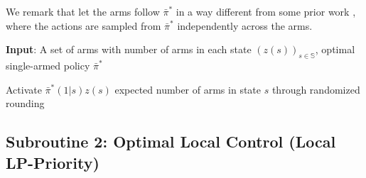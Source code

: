 \documentclass[11pt,letterpaper]{article}
\theoremstyle{plain}
\theoremstyle{definition}
\theoremstyle{remark}
\newcommand{\sspa}{\mathbb{S}}
\newcommand{\pibar}{{\sysbar{\pi}}}
\newcommand{\pibs}{{\pibar^*}}
\newcommand{\sysbar}[1]{\bar{#1}}
\begin{document}
We remark that  let the arms follow $\pibs$ in a way different from some prior work \citep{HonXieCheWan_23,HonXieCheWan_24}, where the actions are sampled from $\pibs$ independently across the arms. 



\begin{subroutine}[t]
\caption{Unconstrained Optimal Control}
\label{alg:follow-pibs}
\hspace*{\algorithmicindent} \hspace{-0.8em} \textbf{Input}: A set of arms with number of arms in each state $(z(s))_{s\in\sspa}$, 
optimal single-armed policy $\pibs$
\begin{algorithmic}[1]
    \For{$s\in\sspa$}
        \State Activate $\pibs(1|s) z(s)$ expected number of arms in state $s$ through randomized rounding 
    \EndFor
\end{algorithmic}    
\end{subroutine}





\subsection{Subroutine 2: Optimal Local Control (Local LP-Priority)}\label{sec:LP-Priority}
\end{document}
